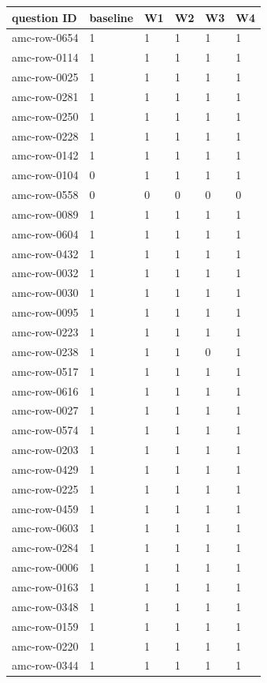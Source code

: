 \begin{tabular}{llllll}
\hline
question ID & baseline & W1 & W2 & W3 & W4 \\
\hline
amc-row-0654 & 1 & 1 & 1 & 1 & 1 \\
amc-row-0114 & 1 & 1 & 1 & 1 & 1 \\
amc-row-0025 & 1 & 1 & 1 & 1 & 1 \\
amc-row-0281 & 1 & 1 & 1 & 1 & 1 \\
amc-row-0250 & 1 & 1 & 1 & 1 & 1 \\
amc-row-0228 & 1 & 1 & 1 & 1 & 1 \\
amc-row-0142 & 1 & 1 & 1 & 1 & 1 \\
amc-row-0104 & 0 & 1 & 1 & 1 & 1 \\
amc-row-0558 & 0 & 0 & 0 & 0 & 0 \\
amc-row-0089 & 1 & 1 & 1 & 1 & 1 \\
amc-row-0604 & 1 & 1 & 1 & 1 & 1 \\
amc-row-0432 & 1 & 1 & 1 & 1 & 1 \\
amc-row-0032 & 1 & 1 & 1 & 1 & 1 \\
amc-row-0030 & 1 & 1 & 1 & 1 & 1 \\
amc-row-0095 & 1 & 1 & 1 & 1 & 1 \\
amc-row-0223 & 1 & 1 & 1 & 1 & 1 \\
amc-row-0238 & 1 & 1 & 1 & 0 & 1 \\
amc-row-0517 & 1 & 1 & 1 & 1 & 1 \\
amc-row-0616 & 1 & 1 & 1 & 1 & 1 \\
amc-row-0027 & 1 & 1 & 1 & 1 & 1 \\
amc-row-0574 & 1 & 1 & 1 & 1 & 1 \\
amc-row-0203 & 1 & 1 & 1 & 1 & 1 \\
amc-row-0429 & 1 & 1 & 1 & 1 & 1 \\
amc-row-0225 & 1 & 1 & 1 & 1 & 1 \\
amc-row-0459 & 1 & 1 & 1 & 1 & 1 \\
amc-row-0603 & 1 & 1 & 1 & 1 & 1 \\
amc-row-0284 & 1 & 1 & 1 & 1 & 1 \\
amc-row-0006 & 1 & 1 & 1 & 1 & 1 \\
amc-row-0163 & 1 & 1 & 1 & 1 & 1 \\
amc-row-0348 & 1 & 1 & 1 & 1 & 1 \\
amc-row-0159 & 1 & 1 & 1 & 1 & 1 \\
amc-row-0220 & 1 & 1 & 1 & 1 & 1 \\
amc-row-0344 & 1 & 1 & 1 & 1 & 1 \\

\end{tabular}
